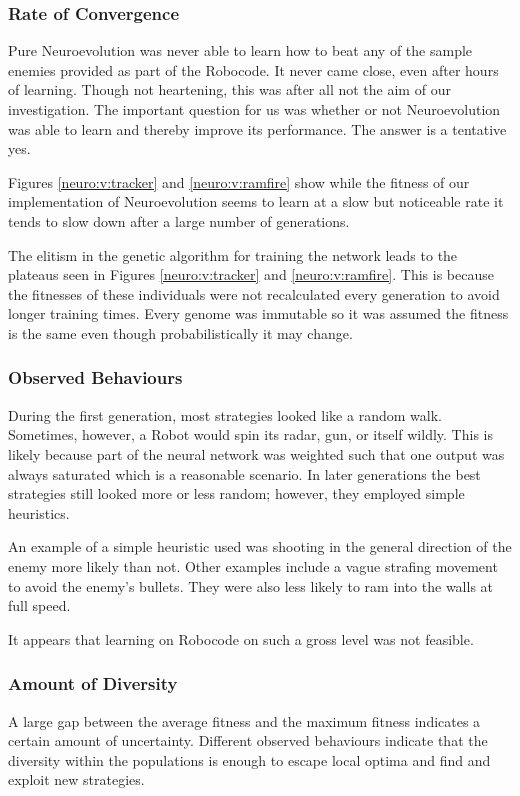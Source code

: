 \subsubsection{Rate of Convergence}
Pure Neuroevolution was never able to learn how to beat any of the sample enemies provided as part of the Robocode. It never came close, even after hours of learning. Though not heartening, this was after all not the aim of our investigation. The important question for us was whether or not Neuroevolution was able to learn and thereby improve its performance. The answer is a tentative yes.

Figures \ref{neuro:v:tracker} and \ref{neuro:v:ramfire} show while the fitness of our implementation of Neuroevolution seems to learn at a slow but noticeable rate it tends to slow down after a large number of generations. 

The elitism in the genetic algorithm for training the network leads to the plateaus seen in Figures \ref{neuro:v:tracker} and \ref{neuro:v:ramfire}. This is because the fitnesses of these individuals were not recalculated every generation to avoid longer training times. Every genome was immutable so it was assumed the fitness is the same even though probabilistically it may change.

\subsubsection{Observed Behaviours}
During the first generation, most strategies looked like a random walk. Sometimes, however, a Robot would spin its radar, gun, or itself wildly. This is likely because part of the neural network was weighted such that one output was always saturated which is a reasonable scenario. In later generations the best strategies still looked more or less random; however, they employed simple heuristics.

An example of a simple heuristic used was shooting in the general direction of the enemy more likely than not. Other examples include a vague strafing movement to avoid the enemy's bullets. They were also less likely to ram into the walls at full speed.

It appears that learning on Robocode on such a gross level was not feasible. 


\FigNeurovTracker
\FigNeurovRamFire


\subsubsection{Amount of Diversity}
A large gap between the average fitness and the maximum fitness indicates a certain amount of uncertainty. Different observed behaviours indicate that the diversity within the populations is enough to escape local optima and find and exploit new strategies.

